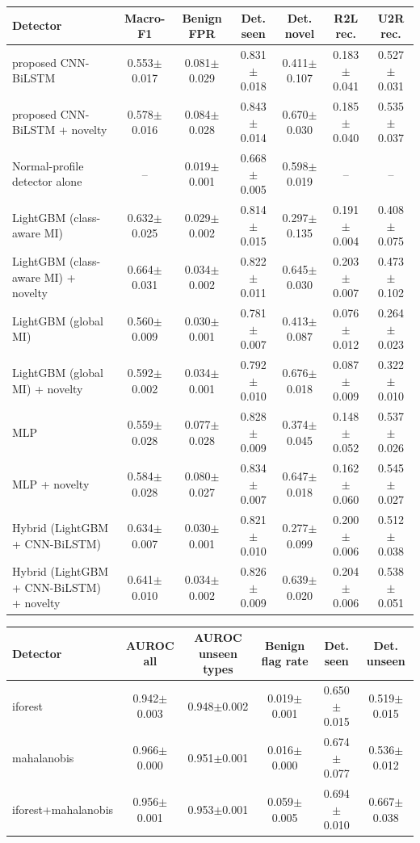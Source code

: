 \begin{tabular}{lcccccc}
\toprule
Detector & Macro-F1 & Benign FPR & Det. seen & Det. novel & R2L rec. & U2R rec. \\
\midrule
proposed CNN-BiLSTM & 0.553$\pm$0.017 & 0.081$\pm$0.029 & 0.831$\pm$0.018 & 0.411$\pm$0.107 & 0.183$\pm$0.041 & 0.527$\pm$0.031 \\
proposed CNN-BiLSTM + novelty & 0.578$\pm$0.016 & 0.084$\pm$0.028 & 0.843$\pm$0.014 & 0.670$\pm$0.030 & 0.185$\pm$0.040 & 0.535$\pm$0.037 \\
Normal-profile detector alone & -- & 0.019$\pm$0.001 & 0.668$\pm$0.005 & 0.598$\pm$0.019 & -- & -- \\
LightGBM (class-aware MI) & 0.632$\pm$0.025 & 0.029$\pm$0.002 & 0.814$\pm$0.015 & 0.297$\pm$0.135 & 0.191$\pm$0.004 & 0.408$\pm$0.075 \\
LightGBM (class-aware MI) + novelty & 0.664$\pm$0.031 & 0.034$\pm$0.002 & 0.822$\pm$0.011 & 0.645$\pm$0.030 & 0.203$\pm$0.007 & 0.473$\pm$0.102 \\
LightGBM (global MI) & 0.560$\pm$0.009 & 0.030$\pm$0.001 & 0.781$\pm$0.007 & 0.413$\pm$0.087 & 0.076$\pm$0.012 & 0.264$\pm$0.023 \\
LightGBM (global MI) + novelty & 0.592$\pm$0.002 & 0.034$\pm$0.001 & 0.792$\pm$0.010 & 0.676$\pm$0.018 & 0.087$\pm$0.009 & 0.322$\pm$0.010 \\
MLP & 0.559$\pm$0.028 & 0.077$\pm$0.028 & 0.828$\pm$0.009 & 0.374$\pm$0.045 & 0.148$\pm$0.052 & 0.537$\pm$0.026 \\
MLP + novelty & 0.584$\pm$0.028 & 0.080$\pm$0.027 & 0.834$\pm$0.007 & 0.647$\pm$0.018 & 0.162$\pm$0.060 & 0.545$\pm$0.027 \\
Hybrid (LightGBM + CNN-BiLSTM) & 0.634$\pm$0.007 & 0.030$\pm$0.001 & 0.821$\pm$0.010 & 0.277$\pm$0.099 & 0.200$\pm$0.006 & 0.512$\pm$0.038 \\
Hybrid (LightGBM + CNN-BiLSTM) + novelty & 0.641$\pm$0.010 & 0.034$\pm$0.002 & 0.826$\pm$0.009 & 0.639$\pm$0.020 & 0.204$\pm$0.006 & 0.538$\pm$0.051 \\
\bottomrule
\end{tabular}

\begin{tabular}{lccccc}
\toprule
Detector & AUROC all & AUROC unseen types & Benign flag rate & Det. seen & Det. unseen \\
\midrule
iforest & 0.942$\pm$0.003 & 0.948$\pm$0.002 & 0.019$\pm$0.001 & 0.650$\pm$0.015 & 0.519$\pm$0.015 \\
mahalanobis & 0.966$\pm$0.000 & 0.951$\pm$0.001 & 0.016$\pm$0.000 & 0.674$\pm$0.077 & 0.536$\pm$0.012 \\
iforest+mahalanobis & 0.956$\pm$0.001 & 0.953$\pm$0.001 & 0.059$\pm$0.005 & 0.694$\pm$0.010 & 0.667$\pm$0.038 \\
\bottomrule
\end{tabular}

